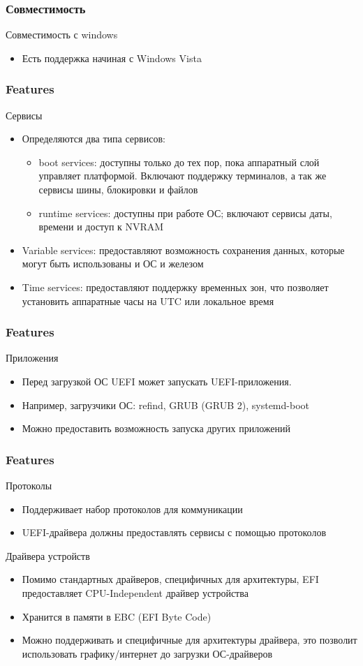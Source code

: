 \documentclass{beamer}
\begin{document}
\begin{frame}\frametitle{Совместимость}
Совместимость с windows
\begin{itemize}
    \item Есть поддержка начиная с Windows Vista
\end{itemize}
\end{frame}

\begin{frame}\frametitle{Features}
Сервисы
\begin{itemize}
    \item Определяются два типа сервисов:
    \begin{itemize}
        \item boot services: доступны только до тех пор, пока аппаратный слой управляет платформой. Включают поддержку терминалов, а так же сервисы шины, блокировки и файлов
        \item runtime services: доступны при работе ОС; включают сервисы даты, времени и доступ к NVRAM
    \end{itemize}
    \item Variable services: предоставляют возможность сохранения данных, которые могут быть использованы и ОС и железом
    \item Time services: предоставляют поддержку временных зон, что позволяет установить аппаратные часы на UTC или локальное время
\end{itemize}
\end{frame}

\begin{frame}\frametitle{Features}
Приложения
\begin{itemize}
    \item Перед загрузкой ОС UEFI может запускать UEFI-приложения.
    \item Например, загрузчики ОС: refind, GRUB (GRUB 2), systemd-boot
    \item Можно предоставить возможность запуска других приложений
\end{itemize}
\end{frame}

\begin{frame}\frametitle{Features}
Протоколы
\begin{itemize}
    \item Поддерживает набор протоколов для коммуникации
    \item UEFI-драйвера должны предоставлять сервисы с помощью протоколов
\end{itemize}
Драйвера устройств
\begin{itemize}
    \item Помимо стандартных драйверов, специфичных для архитектуры, EFI предоставляет CPU-Independent драйвер устройства
    \item Хранится в памяти в EBC (EFI Byte Code)
    \item Можно поддерживать и специфичные для архитектуры драйвера, это позволит использовать графику/интернет до загрузки ОС-драйверов
\end{itemize}
\end{frame}
\end{document}
